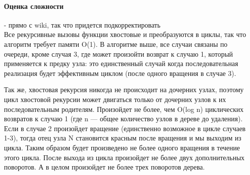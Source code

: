\documentclass[a4paper,10pt]{article}
\begin{document}
\paragraph{Оценка сложности} - прямо с wiki, так что придется подкорректировать \\
Все рекурсивные вызовы функции хвостовые и преобразуются в циклы, так что алгоритм требует памяти O(1). В алгоритме выше, все случаи связаны по очереди, кроме случая 3, где может произойти возврат к случаю 1, который применяется к предку узла: это единственный случай когда последовательная реализация будет эффективным циклом (после одного вращения в случае 3).

Так же, хвостовая рекурсия никогда не происходит на дочерних узлах, поэтому цикл хвостовой рекурсии может двигаться только от дочерних узлов к их последовательным родителям. Произойдет не более, чем O(log n) циклических возвратов к случаю 1 (где n — общее количество узлов в дереве до удаления). Если в случае 2 произойдет вращение (единственно возможное в цикле случаев 1-3), тогда отец узла N становится красным после вращения и мы выходим из цикла. Таким образом будет произведено не более одного вращения в течение этого цикла. После выхода из цикла произойдет не более двух дополнительных поворотов. А в целом произойдет не более трех поворотов дерева.
\end{document}

